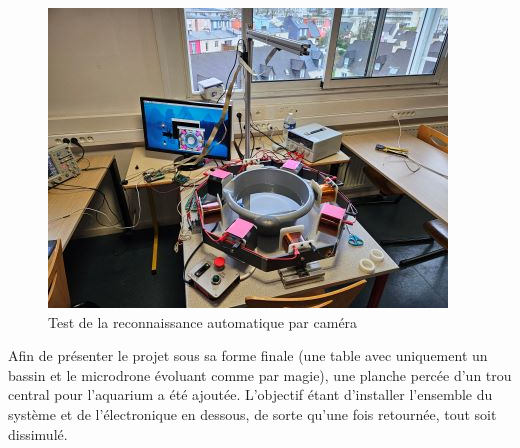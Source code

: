 \documentclass{article}
\begin{document}
\begin{figure}[H]
\begin{minipage}{0.45\textwidth}
        \includegraphics[width=\linewidth, angle=0]{Images/photoFabrications/test2.jpg}
        
    \end{minipage}
    \caption{Test de la reconnaissance automatique par caméra}
    \label{fig:test2}
\end{figure}
\noindent
Afin de présenter le projet sous sa forme finale (une table avec uniquement un bassin et le microdrone évoluant comme par magie), une planche percée d'un trou central pour l'aquarium a été ajoutée. L'objectif étant d'installer l'ensemble du système et de l'électronique en dessous, de sorte qu'une fois retournée, tout soit dissimulé.
\end{document}
